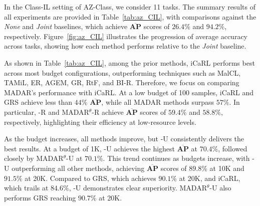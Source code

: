 In the Class-IL setting of AZ-Class, we consider 11 tasks. The summary results of all experiments are provided in Table~\ref{tab:az_CIL}, with comparisons against the \textit{None} and \textit{Joint} baselines, which achieve $\mathbf{\overline{AP}}$ scores of $26.4\%$ and $94.2\%$, respectively. Figure~\ref{fig:az_CIL} illustrates the progression of average accuracy across tasks, showing how each method performs relative to the \textit{Joint} baseline.

As shown in Table~\ref{tab:az_CIL}, among the prior methods, iCaRL performs best across most budget configurations, outperforming techniques such as MalCL, TAMiL, ER, AGEM, GR, RtF, and BI-R. Therefore, we focus on comparing MADAR's performance with iCaRL. At a low budget of 100 samples, iCaRL and GRS achieve less than $44\%$ $\mathbf{\overline{AP}}$, while all MADAR methods surpass $57\%$. In particular, \system-R and MADAR$^\theta$-R achieve $\mathbf{\overline{AP}}$ scores of $59.4\%$ and $58.8\%$, respectively, highlighting their efficiency at low-resource levels.

As the budget increases, all methods improve, but \system-U consistently delivers the best results. At a budget of 1K, \system-U achieves the highest $\mathbf{\overline{AP}}$ at $70.4\%$, followed closely by MADAR$^\theta$-U at $70.1\%$. This trend continues as budgets increase, with \system-U outperforming all other methods, achieving $\mathbf{\overline{AP}}$ scores of $89.8\%$ at 10K and $91.5\%$ at 20K. Compared to GRS, which achieves $90.1\%$ at 20K, and iCaRL, which trails at $84.6\%$, \system-U demonstrates clear superiority. MADAR$^\theta$-U also performs GRS reaching $90.7\%$ at 20K.








